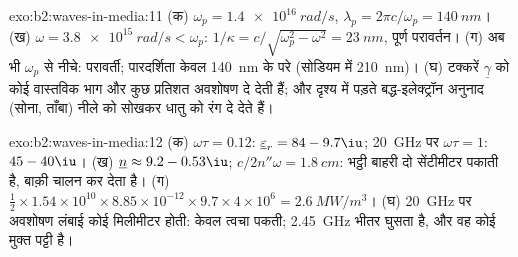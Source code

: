 \begin{solution}{exo:b2:waves-in-media:11}
(क) $\omega_p = \qty{1.4e16}{rad/s}$, $\lambda_p = 2\pi c/\omega_p = \qty{140}{nm}$। (ख) $\omega = \qty{3.8e15}{rad/s}
< \omega_p$: $1/\kappa = c/\sqrt{\omega_p^2 - \omega^2} = \qty{23}{nm}$, पूर्ण परावर्तन। (ग)
अब भी $\omega_p$ से नीचे: परावर्ती; पारदर्शिता केवल \qty{140}{nm} के परे (सोडियम में
\qty{210}{nm})। (घ) टक्करें $\underline\gamma$ को कोई वास्तविक भाग और कुछ प्रतिशत
अवशोषण दे देती हैं; और दृश्य में पड़ते बद्ध-इलेक्ट्रॉन अनुनाद
(सोना, ताँबा) नीले को सोखकर धातु को रंग दे देते हैं।
\end{solution}

\begin{solution}{exo:b2:waves-in-media:12}
(क) $\omega\tau = 0.12$: $\underline\varepsilon_r = 84 - 9.7\iu$; \qty{20}{GHz} पर $\omega\tau = 1$:
$45 - 40\iu$। (ख) $\underline n \approx 9.2 - 0.53\iu$; $c/2n''\omega = \qty{1.8}{cm}$: भट्ठी
बाहरी दो सेंटीमीटर पकाती है, बाक़ी चालन कर देता है। (ग) $\tfrac12 \times
1.54 \times 10^{10} \times 8.85 \times 10^{-12} \times 9.7 \times 4 \times 10^6 = \qty{2.6}{MW/m^3}$। (घ)
\qty{20}{GHz} पर अवशोषण लंबाई कोई मिलीमीटर होती: केवल त्वचा
पकती; \qty{2.45}{GHz} भीतर घुसता है, और वह कोई मुक्त पट्टी है।
\end{solution}

